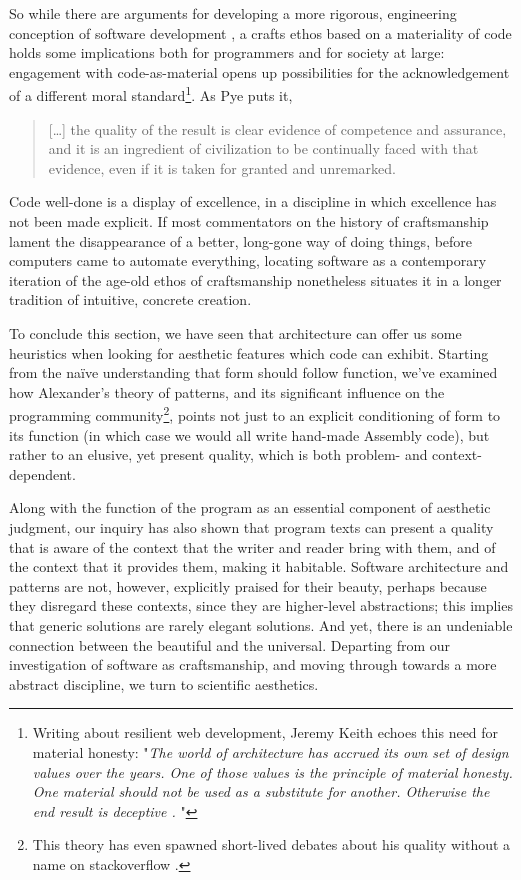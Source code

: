 So while there are arguments for developing a more rigorous, engineering conception of software development \citep{ensmenger_computer_2012}, a crafts ethos based on a materiality of code holds some implications both for programmers and for society at large: engagement with code-as-material opens up possibilities for the acknowledgement of a different moral standard\footnote{Writing about resilient web development, Jeremy Keith echoes this need for material honesty: "\emph{The world of architecture has accrued its own set of design values over the years. One of those values is the principle of material honesty. One material should not be used as a substitute for another. Otherwise the end result is deceptive \citep{keith_resilient_2016}. }"}. As Pye puts it,

\begin{quote}
    [\dots] the quality of the result is clear evidence of competence and assurance, and it is an ingredient of civilization to be continually faced with that evidence, even if it is taken for granted and unremarked. \citep{pye_nature_2008}
\end{quote}

Code well-done is a display of excellence, in a discipline in which excellence has not been made explicit. If most commentators on the history of craftsmanship lament the disappearance of a better, long-gone way of doing things, before computers came to automate everything, locating software as a contemporary iteration of the age-old ethos of craftsmanship nonetheless situates it in a longer tradition of intuitive, concrete creation.

\spacersmall

To conclude this section, we have seen that architecture can offer us some heuristics when looking for aesthetic features which code can exhibit. Starting from the naïve understanding that form should follow function, we've examined how Alexander's theory of patterns, and its significant influence on the programming community\footnote{This theory has even spawned short-lived debates about his quality without a name on stackoverflow \citep{interstar_quality_2017}.}, points not just to an explicit conditioning of form to its function (in which case we would all write hand-made Assembly code), but rather to an elusive, yet present quality, which is both problem- and context-dependent.

Along with the function of the program as an essential component of aesthetic judgment, our inquiry has also shown that program texts can present a quality that is aware of the context that the writer and reader bring with them, and of the context that it provides them, making it habitable. Software architecture and patterns are not, however, explicitly praised for their beauty, perhaps because they disregard these contexts, since they are higher-level abstractions; this implies that generic solutions are rarely elegant solutions. And yet, there is an undeniable connection between the beautiful and the universal. Departing from our investigation of software as craftsmanship, and moving through towards a more abstract discipline, we turn to scientific aesthetics.

